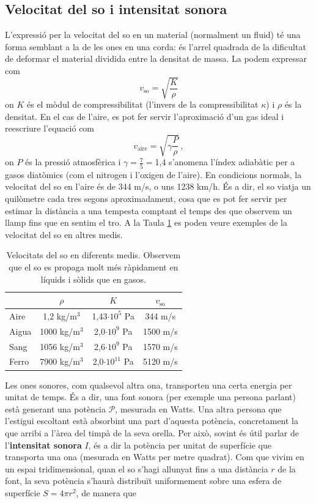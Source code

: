 \documentclass[12pt]{book}
\begin{document}
\subsection{Velocitat del so i intensitat sonora}

L'expressió per la velocitat del so en un material (normalment un fluid) té una forma semblant a la de les ones en una corda: és l'arrel quadrada de la dificultat de deformar el material dividida entre la densitat de massa. La podem expressar com
%
\begin{equation}
    \boxed{v_\text{so} = \sqrt{\frac{K}{\rho}}}
\end{equation}
%
on $K$ és el mòdul de compressibilitat (l'invers de la compressibilitat $\kappa$) i $\rho$ és la densitat. En el cas de l'aire, es pot fer servir l'aproximació d'un gas ideal i reescriure l'equació com
%
\begin{equation}
    v_\text{aire} = \sqrt{\gamma \frac{P}{\rho}}\, ,
\end{equation}
%
on $P$ és la pressió atmosfèrica i $\gamma = \frac{7}{5} = $1,4 s'anomena l'índex adiabàtic per a gasos diatòmics (com el nitrogen i l'oxigen de l'aire). En condicions normals, la velocitat del so en l'aire és de 344 m/s, o uns 1238 km/h. És a dir, el so viatja un quilòmetre cada tres segons aproximadament, cosa que es pot fer servir per estimar la distància a una tempesta comptant el temps des que observem un llamp fins que en sentim el tro. A la Taula \ref{tab:VelocitatDelSo} es poden veure exemples de la velocitat del so en altres medis.
%
\begin{table}[H]
    \centering
    \begin{tabular}{|l|c|c|c|}
    \hline
              & $\rho$ & $K$& $v_\text{so}$\\ \hline
        Aire  & 1,2 kg/m$^3$ & 1,43$\cdot 10^5$ Pa & 344 m/s\\ \hline
        Aigua & 1000 kg/m$^3$ & 2,0$\cdot 10^9$ Pa & 1500 m/s\\ \hline
        Sang  & 1056 kg/m$^3$ & 2,6$\cdot 10^9$ Pa & 1570 m/s\\ \hline
        Ferro & 7900 kg/m$^3$ & 2,0$\cdot 10^{11}$ Pa & 5120 m/s\\ \hline
    \end{tabular}
    \caption{Velocitats del so en diferents medis. Observem que el so es propaga molt més ràpidament en líquids i sòlids que en gasos.}
    \label{tab:VelocitatDelSo}
\end{table}
%
Les ones sonores, com qualsevol altra ona, transporten una certa energia per unitat de temps. És a dir, una font sonora (per exemple una persona parlant) està generant una potència $\mathcal{P}$, mesurada en Watts. Una altra persona que l'estigui escoltant està absorbint una part d'aquesta potència, concretament la que arribi a l'àrea del timpà de la seva orella. Per això, sovint és útil parlar de l'{\bf intensitat sonora} $I$, és a dir la potència per unitat de superfície que transporta una ona (mesurada en Watts per metre quadrat). Com que vivim en un espai tridimensional, quan el so s'hagi allunyat fins a una distància $r$ de la font, la seva potència s'haurà distribuït uniformement sobre una esfera de superfície $S = 4 \pi r^2$, de manera que
\end{document}
